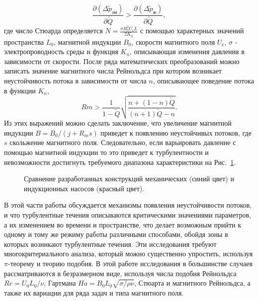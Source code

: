 \begin{equation*}
    \frac{\partial (\Delta \widetilde{p}_{эм})} {\partial \widetilde{Q}} > \frac{\partial (\Delta \widetilde{p}_{ж})} {\partial \widetilde{Q}},
\end{equation*}
где число Стюарда определяется $N = \frac{\sigma B_{0}^2 U_{с} L}{2K_{n}}$ с помощью характерных значений пространства $L_0$, магнитной индукции $B_{0}$, скорости магнитного поля $U_{с}$, $\sigma$ - электропроводность среды и функция $K_{n}$, описывающая изменения давления в зависимости от скорости. После ряда математических преобразований можно записать значение магнитного числа Рейнольдса при котором возникает неустойчивость потока в зависимости от числа $n$, описывающее поведение потока в функции $K_{n}$, 
\begin{equation*}
    Rm > \frac{1}{1-\widetilde{Q}} \sqrt{\frac{n+(1-n) \widetilde{Q}}{(n+1)\widetilde{Q}-n}}.
\end{equation*}
Из этих выражений можно сделать заключение, что увеличение магнитной индукции $B = B_{0} / (j + R_{m}s)$ приведет к появлению неустойчивых потоков, где $s$ скольжение магнитного поля. Следовательно, если варьировать давление с помощью магнитной индукции то это приведет к турбулентности и невозможности достигнуть требуемого диапазона характеристики на Рис.~\ref{fig:intreting_pq}. 

\begin{figure}[h]
	\caption{Сравнение разработанных конструкций механических (синий цвет) и индукционных насосов (красный цвет).}
	\label{fig:intreting_pq}
\end{figure}

В этой части работы обсуждается механизмы появления неустойчивости потоков, и что турбулентные течения описываются критическими значениями параметров, а их изменением во времени и пространстве, что делает возможным прийти к одному и тому же режиму работы различными способами, обойдя зоны в которых возникают турбулентные течения. Эти исследования требуют многокритериального анализа, который можно существенно упростить, используя $\pi$-теорему и теорию подобия. В этой работе исследования в большинстве случаев рассматриваются в безразмерном виде, используя числа подобия Рейнольдса $Re= U_{0} L_{0}/ \nu$, Гартмана $Ha = B_{0} L_{0} \sqrt{\sigma/ \rho \nu}$, Стюарта и магнитного Рейнольдса, а также их вариации для ряда задач и типа магнитного поля. 


